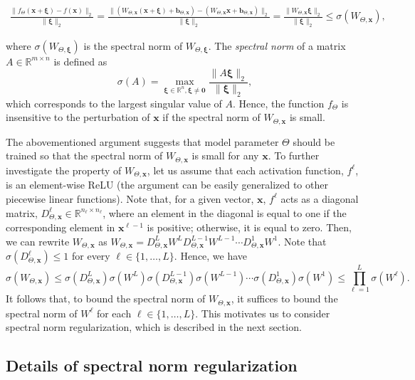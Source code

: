 \begin{align*}
  \frac{\|f_\Theta({\bm x} + {\bm \xi}) - f({\bm x})\|_2}{\|{\bm \xi}\|_2}
  = \frac{\|(W_{\Theta,{\bm x}}({\bm x} + {\bm \xi}) + {\bm b}_{\Theta,{\bm x}}) - (W_{\Theta,{\bm x}}{\bm x} + {\bm b}_{\Theta,{\bm x}}) \|_2 }{\|{\bm \xi}\|_2}
  = \frac{\|W_{\Theta,{\bm x}}{\bm \xi}\|_2}{\|{\bm \xi}\|_2} \leq \sigma(W_{\Theta,{\bm x}}),
\end{align*}

where $\sigma(W_{\Theta,{\bm \xi}})$ is the spectral norm of $W_{\Theta,{\bm \xi}}$.
The \emph{spectral norm} of a matrix $A \in \mathbb{R}^{m \times n}$ is defined as
\[
  \sigma(A) = \max_{{\bm \xi} \in \mathbb{R}^n,{\bm \xi} \neq {\bm 0}}\frac{\|A {\bm \xi}\|_2}{\|{\bm \xi}\|_2},
\]
which corresponds to the largest singular value of $A$. Hence, the function $f_\Theta$ is insensitive to the perturbation of ${\bm x}$ if the spectral norm of $W_{\Theta,{\bm x}}$ is small.

The abovementioned argument suggests that model parameter $\Theta$ should be trained so that the spectral norm of $W_{\Theta,{\bm x}}$ is small for any ${\bm x}$. To further investigate the property of $W_{\Theta,{\bm x}}$, let us assume that each activation function, $f^\ell$, is an element-wise ReLU (the argument can be easily generalized to other piecewise linear functions). Note that, for a given vector, ${\bm x}$, $f^\ell$ acts as a diagonal matrix, $D^\ell_{\Theta,{\bm x}} \in \mathbb{R}^{n_\ell \times n_{\ell}}$, where an element in the diagonal is equal to one if the corresponding element in ${\bm x}^{\ell-1}$ is positive; otherwise, it is equal to zero. Then, we can rewrite $W_{\Theta,{\bm x}}$ as $W_{\Theta,{\bm x}} = D^{L}_{\Theta,{\bm x}}W^{L}D^{L-1}_{\Theta,{\bm x}} W^{L-1} \cdots D^1_{\Theta,{\bm x}} W^1$. Note that $\sigma(D^\ell_{\Theta,{\bm x}}) \leq 1$ for every $\ell \in \{1,\ldots,L\}$.
Hence, we have
\[
  \sigma(W_{\Theta,{\bm x}})
  \leq
  \sigma(D^{L}_{\Theta,{\bm x}})\sigma(W^{L})\sigma(D^{L-1}_{\Theta,{\bm x}}) \sigma(W^{L-1}) \cdots \sigma(D^{1}_{\Theta,{\bm x}}) \sigma(W^1)
  \leq
  \prod_{\ell=1}^L \sigma(W^\ell).
\]
It follows that, to bound the spectral norm of $W_{\Theta,{\bm x}}$, it suffices to bound the spectral norm of $W^\ell$ for each $\ell \in \{1,\ldots,L\}$.
This motivates us to consider spectral norm regularization, which is described in the next section.

\subsection{Details of spectral norm regularization}\label{subsec:proposed}

